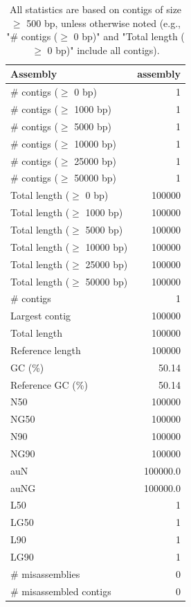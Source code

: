 \documentclass[12pt,a4paper]{article}
\begin{document}
\begin{table}[ht]
\begin{center}
\caption{All statistics are based on contigs of size $\geq$ 500 bp, unless otherwise noted (e.g., "\# contigs ($\geq$ 0 bp)" and "Total length ($\geq$ 0 bp)" include all contigs).}
\begin{tabular}{|l*{1}{|r}|}
\hline
Assembly & assembly \\ \hline
\# contigs ($\geq$ 0 bp) & 1 \\ \hline
\# contigs ($\geq$ 1000 bp) & 1 \\ \hline
\# contigs ($\geq$ 5000 bp) & 1 \\ \hline
\# contigs ($\geq$ 10000 bp) & 1 \\ \hline
\# contigs ($\geq$ 25000 bp) & 1 \\ \hline
\# contigs ($\geq$ 50000 bp) & 1 \\ \hline
Total length ($\geq$ 0 bp) & 100000 \\ \hline
Total length ($\geq$ 1000 bp) & 100000 \\ \hline
Total length ($\geq$ 5000 bp) & 100000 \\ \hline
Total length ($\geq$ 10000 bp) & 100000 \\ \hline
Total length ($\geq$ 25000 bp) & 100000 \\ \hline
Total length ($\geq$ 50000 bp) & 100000 \\ \hline
\# contigs & 1 \\ \hline
Largest contig & 100000 \\ \hline
Total length & 100000 \\ \hline
Reference length & 100000 \\ \hline
GC (\%) & 50.14 \\ \hline
Reference GC (\%) & 50.14 \\ \hline
N50 & 100000 \\ \hline
NG50 & 100000 \\ \hline
N90 & 100000 \\ \hline
NG90 & 100000 \\ \hline
auN & 100000.0 \\ \hline
auNG & 100000.0 \\ \hline
L50 & 1 \\ \hline
LG50 & 1 \\ \hline
L90 & 1 \\ \hline
LG90 & 1 \\ \hline
\# misassemblies & 0 \\ \hline
\# misassembled contigs & 0 \\ \hline

\end{tabular}
\end{center}
\end{table}
\end{document}
